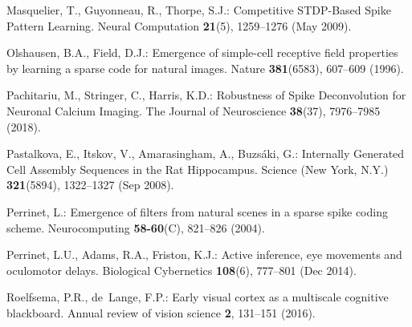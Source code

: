 \documentclass[runningheads]{llncs}
\begin{document}
\begin{thebibliography}{10}
  Masquelier, T., Guyonneau, R., Thorpe, S.J.: Competitive {STDP}-{Based} {Spike} {Pattern} {Learning}. Neural Computation  \textbf{21}(5),  1259--1276 (May 2009). %
  
  Olshausen, B.A., Field, D.J.: Emergence of simple-cell receptive field properties by learning a sparse code for natural images. Nature  \textbf{381}(6583),  607--609 (1996). %
  
  Pachitariu, M., Stringer, C., Harris, K.D.: Robustness of {Spike} {Deconvolution} for {Neuronal} {Calcium} {Imaging}. The Journal of Neuroscience  \textbf{38}(37),  7976--7985 (2018). %
  
  Pastalkova, E., Itskov, V., Amarasingham, A., Buzsáki, G.: Internally {Generated} {Cell} {Assembly} {Sequences} in the {Rat} {Hippocampus}. Science (New York, N.Y.)  \textbf{321}(5894),  1322--1327 (Sep 2008). %
  
  Perrinet, L.: Emergence of filters from natural scenes in a sparse spike coding scheme. Neurocomputing  \textbf{58-60}(C),  821--826 (2004). %
  
  Perrinet, L.U., Adams, R.A., Friston, K.J.: Active inference, eye movements and oculomotor delays. Biological Cybernetics  \textbf{108}(6),  777--801 (Dec 2014). %
  
  Roelfsema, P.R., de~Lange, F.P.: Early visual cortex as a multiscale cognitive blackboard. Annual review of vision science  \textbf{2},  131--151 (2016). %
  

\end{thebibliography}
\end{document}
